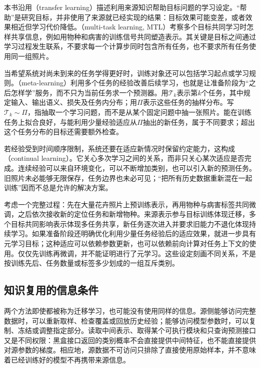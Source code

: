 本书沿用（transfer learning）描述利用来源知识帮助目标问题的学习设定。“帮助”是研究目标，并非使用了来源就已经实现的结果：目标效果可能变差，或者效果相近但学习代价降低。（multi-task learning, MTL）考察多个目标共同学习时怎样共享信息，例如用物种和病害的训练信号共同塑造表示。其关键是目标之间通过学习过程发生联系，不要求每一个计算步同时包含所有任务，也不要求所有任务使用同一组照片。

当希望系统对尚未到来的任务学得更好时，训练对象还可以包括学习起点或学习规则。（meta-learning）利用多个任务的经验改善后续学习，也就是让准备阶段为“之后怎样学”服务，而不只为当前任务求一个预测器。用$\mathcal T_k$表示第$k$个任务，其中规定输入、输出语义、损失及任务内分布；用$\Pi$表示这些任务的抽样分布。写$\mathcal T_k\sim\Pi$，指抽取一个学习问题，而不是从某个固定问题中抽一张照片。能在训练任务上拟合良好，与能利用少量经验适应从$\Pi$抽出的新任务，属于不同要求；超出这个任务分布的目标还需要额外检查。

若经验受到时间顺序限制，系统还要在适应新情况时保留约定能力，这构成（continual learning）。它关心多次学习之间的关系，而非只关心某次适应是否完成。连续经验可以来自环境变化，可以不断增加类别，也可以引入新的预测任务。旧照片未必能够无限保存，任务边界也未必可见；“把所有历史数据重新混在一起训练”因而不总是允许的解决方案。

考虑一个完整过程：先在大量花卉照片上预训练表示，再用物种与病害标签共同微调，之后依次接收新的定位任务和新增物种。来源表示参与目标训练体现迁移，多个目标共同影响表示体现多任务共享，新任务逐次进入并要求旧能力不退化体现持续学习。如果准备阶段还明确优化利用少量任务经验后的适应效果，就进一步具有元学习目标；这种适应可以依赖参数更新，也可以依赖前向计算对任务上下文的使用。仅仅先训练再微调，并不能证明进行了元学习。这些设定刻画不同关系，不是按训练先后、任务数量或标签多少划成的一组互斥类别。

\subsection{知识复用的信息条件}
\label{sec:ket-overview-information}

两个方法即使都被称为迁移学习，也可能没有使用同样的信息。源侧能够访问完整数据时，可以重新取样、检查覆盖或回放历史经验；能够访问模型参数时，可以复制、冻结或调整指定部分。读取中间表示、取得某个可执行模块和只查询预测接口又是不同权限：黑盒接口返回的类别概率不会直接提供中间特征，也不能直接提供对源参数的梯度。相应地，源数据不可访问只排除了直接使用原始样本，并不意味着已经训练好的模型不再携带来源信息。

